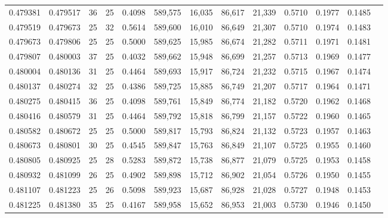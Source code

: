 \begin{tabular}{rrrrrrrrrrrrr}
0.479381 & 0.479517 &    36 &  25 &                                     0.4098 & 589,575 &  16,035 &  86,617 &  21,339 & 0.5710 & 0.1977 & 0.1485 \\
0.479519 & 0.479673 &    25 &  32 &                                     0.5614 & 589,600 &  16,010 &  86,649 &  21,307 & 0.5710 & 0.1974 & 0.1483 \\
0.479673 & 0.479806 &    25 &  25 &                                     0.5000 & 589,625 &  15,985 &  86,674 &  21,282 & 0.5711 & 0.1971 & 0.1481 \\
0.479807 & 0.480003 &    37 &  25 &                                     0.4032 & 589,662 &  15,948 &  86,699 &  21,257 & 0.5713 & 0.1969 & 0.1477 \\
0.480004 & 0.480136 &    31 &  25 &                                     0.4464 & 589,693 &  15,917 &  86,724 &  21,232 & 0.5715 & 0.1967 & 0.1474 \\
0.480137 & 0.480274 &    32 &  25 &                                     0.4386 & 589,725 &  15,885 &  86,749 &  21,207 & 0.5717 & 0.1964 & 0.1471 \\
0.480275 & 0.480415 &    36 &  25 &                                     0.4098 & 589,761 &  15,849 &  86,774 &  21,182 & 0.5720 & 0.1962 & 0.1468 \\
0.480416 & 0.480579 &    31 &  25 &                                     0.4464 & 589,792 &  15,818 &  86,799 &  21,157 & 0.5722 & 0.1960 & 0.1465 \\
0.480582 & 0.480672 &    25 &  25 &                                     0.5000 & 589,817 &  15,793 &  86,824 &  21,132 & 0.5723 & 0.1957 & 0.1463 \\
0.480673 & 0.480801 &    30 &  25 &                                     0.4545 & 589,847 &  15,763 &  86,849 &  21,107 & 0.5725 & 0.1955 & 0.1460 \\
0.480805 & 0.480925 &    25 &  28 &                                     0.5283 & 589,872 &  15,738 &  86,877 &  21,079 & 0.5725 & 0.1953 & 0.1458 \\
0.480932 & 0.481099 &    26 &  25 &                                     0.4902 & 589,898 &  15,712 &  86,902 &  21,054 & 0.5726 & 0.1950 & 0.1455 \\
0.481107 & 0.481223 &    25 &  26 &                                     0.5098 & 589,923 &  15,687 &  86,928 &  21,028 & 0.5727 & 0.1948 & 0.1453 \\
0.481225 & 0.481380 &    35 &  25 &                                     0.4167 & 589,958 &  15,652 &  86,953 &  21,003 & 0.5730 & 0.1946 & 0.1450 \\

\end{tabular}
